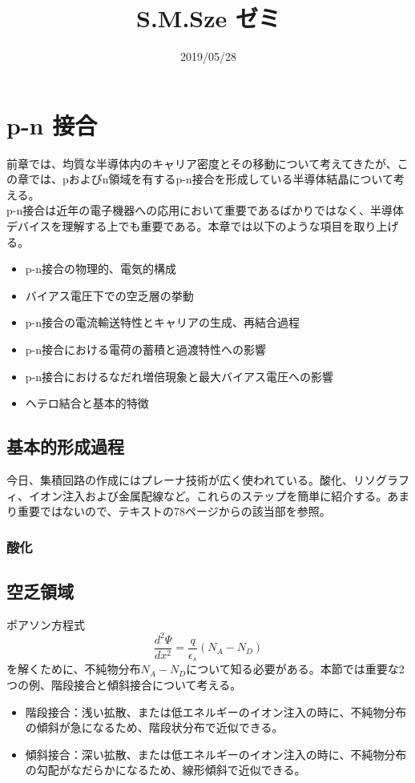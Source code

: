 \documentclass[10pt]{ujarticle}
\title{S.M.Sze ゼミ}
\date{2019/05/28}
\begin{document}
\maketitle
\section{p-n 接合}
前章では、均質な半導体内のキャリア密度とその移動について考えてきたが、この章では、pおよびn領域を有するp-n接合を形成している半導体結晶について考える。\\
p-n接合は近年の電子機器への応用において重要であるばかりではなく、半導体デバイスを理解する上でも重要である。本章では以下のような項目を取り上げる。
\begin{itemize}
\item p-n接合の物理的、電気的構成
\item バイアス電圧下での空乏層の挙動
\item p-n接合の電流輸送特性とキャリアの生成、再結合過程
\item p-n接合における電荷の蓄積と過渡特性への影響
\item p-n接合におけるなだれ増倍現象と最大バイアス電圧への影響
\item ヘテロ結合と基本的特徴
\end{itemize}  

\subsection{基本的形成過程}
今日、集積回路の作成にはプレーナ技術が広く使われている。酸化、リソグラフィ、イオン注入および金属配線など。これらのステップを簡単に紹介する。あまり重要ではないので、テキストの78ページからの該当部を参照。

\subsubsection{酸化}



\subsection{空乏領域}
ポアソン方程式
\begin{equation}
  \frac{d^2 \Psi}{dx^2} = \frac{q}{\epsilon_s} (N_A - N_D)
\end{equation}
を解くために、不純物分布$N_A-N_D$について知る必要がある。本節では重要な2つの例、階段接合と傾斜接合について考える。\\
\begin{itemize}
  \item 階段接合：浅い拡散、または低エネルギーのイオン注入の時に、不純物分布の傾斜が急になるため、階段状分布で近似できる。
  \item 傾斜接合：深い拡散、または低エネルギーのイオン注入の時に、不純物分布の勾配がなだらかになるため、線形傾斜で近似できる。
\end{itemize}
\end{document}
